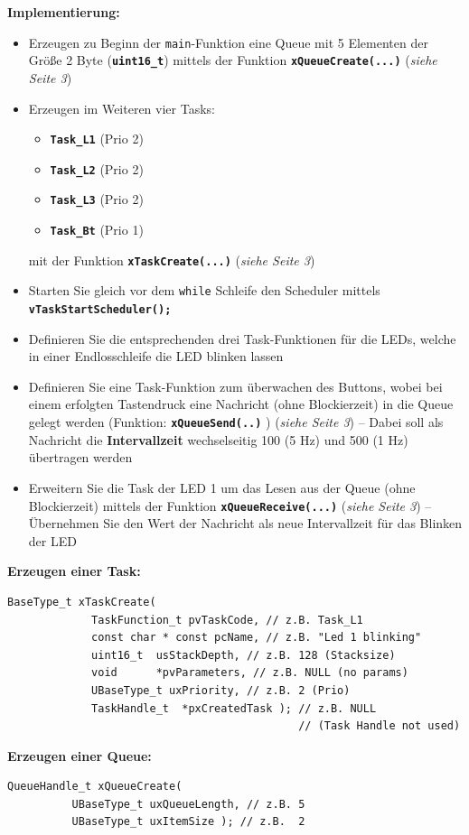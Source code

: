 \documentclass[
    fontsize=12pt,                      %
    paper=a4,                           %
    twoside=off,                       %
    DIV=15,                             %
    BCOR=12mm,                          %
    headings=normal,                    %
    headsepline=false,                   %
    footsepline=false,                  %
    headinclude=true,                   %
    footinclude=false,                  %
    toc=listof,                         %
    toc=bib,                            %
    chapterprefix=false,                %
    appendixprefix=false,               %
    numbers=noendperiod,                %
    captions=tableabove,                %
    footnotes=multiple,                 %
    bibliography=oldstyle,              %
    draft=false,                        %
]{scrreprt}
\newcommand{\Farbcode}[1]{\texttt{\textbf{\textcolor{myred}{#1}}}}
\begin{document}
\noindent
\textbf{Implementierung:}

\noindent
\begin{itemize}
\item Erzeugen zu Beginn der \texttt{main}-Funktion eine Queue mit 5 Elementen der Größe 2 Byte (\Farbcode{uint16\_t}) mittels der Funktion \Farbcode{xQueueCreate(...)} (\emph{siehe Seite 3})	
\item Erzeugen im Weiteren vier Tasks:
\begin{itemize}
	\item \Farbcode{Task\_L1} (Prio 2)
	\item \Farbcode{Task\_L2} (Prio 2)
	\item \Farbcode{Task\_L3} (Prio 2)
	\item \Farbcode{Task\_Bt} (Prio 1)
\end{itemize}
mit der Funktion \Farbcode{xTaskCreate(...)} (\emph{siehe Seite 3})
\item Starten Sie gleich vor dem \texttt{while} Schleife den Scheduler mittels \\
\Farbcode{vTaskStartScheduler();}
\item Definieren Sie die entsprechenden drei Task-Funktionen für die LEDs, welche in einer Endlosschleife die LED blinken lassen
\item Definieren Sie eine Task-Funktion zum überwachen des Buttons, wobei bei einem erfolgten Tastendruck eine Nachricht (ohne Blockierzeit) in die Queue gelegt werden (Funktion: \Farbcode{xQueueSend(..)} ) (\emph{siehe Seite 3}) -- Dabei soll als Nachricht die \textbf{Intervallzeit} wechselseitig 100 (5 Hz) und 500 (1 Hz) übertragen werden
\item Erweitern Sie die Task der LED 1 um das Lesen aus der Queue (ohne Blockierzeit) mittels der Funktion \Farbcode{xQueueReceive(...)} (\emph{siehe Seite 3}) -- Übernehmen Sie den Wert der Nachricht als neue Intervallzeit für das Blinken der LED

\end{itemize}

\newpage
\noindent
\textbf{Erzeugen einer Task:}
\begin{lstlisting}[frame=single,  label=LST_MyCam]
BaseType_t xTaskCreate(
             TaskFunction_t pvTaskCode, // z.B. Task_L1
             const char * const pcName, // z.B. "Led 1 blinking"
             uint16_t  usStackDepth, // z.B. 128 (Stacksize)
             void      *pvParameters, // z.B. NULL (no params)
             UBaseType_t uxPriority, // z.B. 2 (Prio)
             TaskHandle_t  *pxCreatedTask ); // z.B. NULL 
                                             // (Task Handle not used)
\end{lstlisting}
\vskip 1cm
\textbf{Erzeugen einer Queue:}
\begin{lstlisting}[frame=single,  label=LST_MyCam]
	QueueHandle_t xQueueCreate( 
	      UBaseType_t uxQueueLength, // z.B. 5 
	      UBaseType_t uxItemSize ); // z.B.  2
\end{lstlisting}
\end{document}
